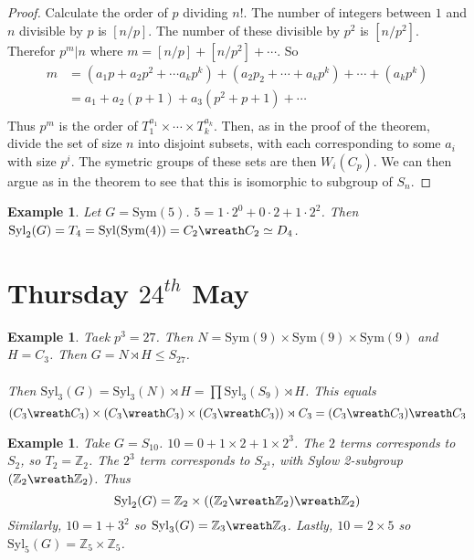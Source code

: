 \documentclass[a4paper,10pt]{article}
\newcommand{\ZZ}{\mathbb{Z}}
\newtheorem{eg}[thm]{Example}
\begin{document}
\begin{proof}
Calculate the order of $p$ dividing $n!$. The number of integers between $1$ and $n$ divisible by $p$ is $[n / p ]$. The number of these divisible by $p^2$ is $[n / p^2]$. Therefor $p^m | n$ where $m = [n / p] + [n / p^2] + \cdots$. So
\begin{align*}
 m     &= (a_1 p + a_2 p^2 + \cdots a_k p^k) + (a_2 p_2 + \cdots + a_k p^k) + \cdots + (a_k p^k) \\
       &= a_1 + a_2 ( p + 1) + a_3 ( p^2 + p + 1) + \cdots \\
\end{align*}
Thus $p^m$ is the order of $T_1^{a_1} \times \cdots \times T_k^{a_k}$. Then, as in the proof of the theorem, divide the set of size $n$ into disjoint subsets, with each corresponding to some $a_i$ with size $p^i$. The symetric groups of these sets are then $W_i(C_p)$. We can then argue as in the theorem to see that this is isomorphic to  subgroup of $S_n$. 
\end{proof}


\begin{eg}
Let $G = \text{Sym}(5)$. $5 = 1 \cdot 2^0 + 0 \cdot 2 + 1 \cdot 2^2$. Then $\text{Syl}_2(G) = T_{4} = \text{Syl}( \text{Sym} (4) ) = C_2 \wreath C_2 \simeq D_4$.  
\end{eg}





\newpage
\section{Thursday $24^{th}$ May}

\begin{eg}
Taek $p^3 = 27$. Then $N = \text{Sym}(9) \times \text{Sym}(9) \times \text{Sym}(9)$ and $H = C_3$. Then $G = N \rtimes H \leq S_{27}$. \\
\\
Then $\text{Syl}_3(G) = \text{Syl}_3(N) \rtimes H = \prod \text{Syl}_3(S_9) \rtimes H$. This equals
\[ (C_3 \wreath C_3) \times (C_3 \wreath C_3) \times (C_3 \wreath C_3)) \rtimes C_3 = (C_3 \wreath C_3) \wreath C_3 \] 
\end{eg}

\begin{eg}
Take $G = S_{10}$. $10 = 0 + 1 \times 2 + 1 \times 2^3$. The $2$ terms corresponds to $S_2$, so $T_2 = \ZZ_2$. The $2^3$ term corresponds to $S_{2^3}$, with Sylow 2-subgroup $(\ZZ_2 \wreath \ZZ_2)$. Thus
\[ \text{Syl}_2(G) =  \ZZ_2 \times ((\ZZ_2 \wreath \ZZ_2) \wreath \ZZ_2) \]
Similarly, $10 = 1 + 3^2$ so $\text{Syl}_3(G) = \ZZ_3 \wreath \ZZ_3$. Lastly, $10 = 2 \times 5$ so $\text{Syl}_5(G) = \ZZ_5 \times \ZZ_5$. 
\end{eg}
\end{document}
